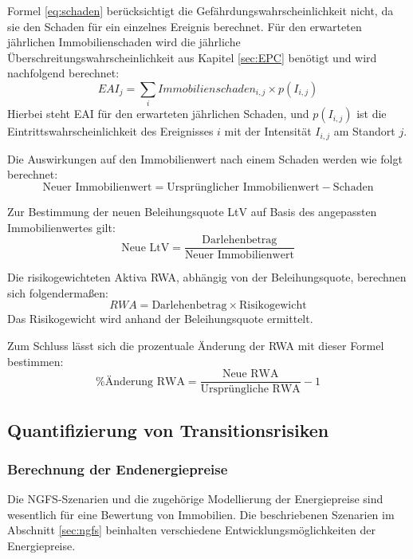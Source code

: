 Formel \ref{eq:schaden} berücksichtigt die Gefährdungswahrscheinlichkeit nicht, da sie den Schaden für ein einzelnes Ereignis berechnet. Für den erwarteten jährlichen Immobilienschaden wird die jährliche Überschreitungswahrscheinlichkeit aus Kapitel \ref{sec:EPC} benötigt und wird nachfolgend berechnet:
\begin{equation}
    EAI_j = \sum_i Immobilienschaden_{i,j} \times p(I_{i,j})
    \label{eq:EAI}
\end{equation}
Hierbei steht \acs{EAI} für den erwarteten jährlichen Schaden, und \( p(I_{i,j}) \) ist die Eintrittswahrscheinlichkeit des Ereignisses \( i \) mit der Intensität \( I_{i,j} \) am Standort \( j \).

Die Auswirkungen auf den Immobilienwert nach einem Schaden werden wie folgt berechnet:
\begin{equation}
    \text{Neuer Immobilienwert} = \text{Ursprünglicher Immobilienwert} - \text{Schaden}
\end{equation}

Zur Bestimmung der neuen Beleihungsquote \ac{LtV} auf Basis des angepassten Immobilienwertes gilt:
\begin{equation}
    \text{Neue LtV} = \frac{\text{Darlehenbetrag}}{\text{Neuer Immobilienwert}}
\end{equation}

Die risikogewichteten Aktiva \acs{RWA}, abhängig von der Beleihungsquote, berechnen sich folgendermaßen:
\begin{equation}
    RWA = \text{Darlehenbetrag} \times \text{Risikogewicht}
\end{equation}
Das Risikogewicht wird anhand der Beleihungsquote ermittelt.

Zum Schluss lässt sich die prozentuale Änderung der \acs{RWA} mit dieser Formel bestimmen:
\begin{equation}
    \% \text{Änderung RWA} = \frac{\text{Neue RWA}}{\text{Ursprüngliche RWA}} - 1
\end{equation}
\subsection{Quantifizierung von Transitionsrisiken}
\subsubsection{Berechnung der Endenergiepreise}
Die \ac{NGFS}-Szenarien und die zugehörige Modellierung der Energiepreise sind wesentlich für eine Bewertung von Immobilien. Die beschriebenen Szenarien im Abschnitt \ref{sec:ngfs} beinhalten verschiedene Entwicklungsmöglichkeiten der Energiepreise.

